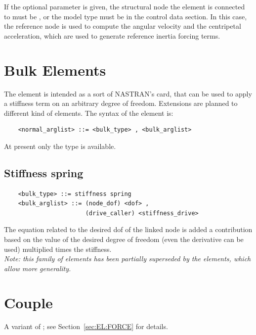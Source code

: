 If the optional  parameter is given, the structural
node the element is connected to must be , or the model type
must be  in the control data section.
In this case, the reference node is used to compute the angular velocity
and the centripetal acceleration, which are used to generate reference
inertia forcing terms.


\section{Bulk Elements}
The  element is intended as a sort of NASTRAN's  card,
that can be used to apply a stiffness term on an arbitrary degree of freedom.
Extensions are planned to different kind of elements.
The syntax of the  element is:
\begin{verbatim}
    <normal_arglist> ::= <bulk_type> , <bulk_arglist>
\end{verbatim}
At present only the  type is available.

\subsection{Stiffness spring}
\begin{verbatim}
    <bulk_type> ::= stiffness spring
    <bulk_arglist> ::= (node_dof) <dof> ,
                       (drive_caller) <stiffness_drive>
\end{verbatim}
The equation related to the desired dof of the linked node is added a
contribution based on the value of the desired degree of freedom (even the
derivative can be used) multiplied times the stiffness. \\
{\em Note: this family of elements has been partially superseded by the
 elements, which allow more generality.}




\section{Couple}
A variant of ; see Section~\ref{sec:EL:FORCE} for details.




